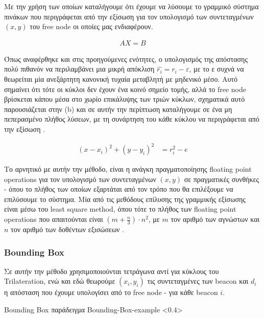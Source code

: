 Με την χρήση των οποίων καταλήγουμε ότι έχουμε να λύσουμε το γραμμικό σύστημα πινάκων που περιγράφεται από την εξίσωση  για τον
υπολογισμό των συντεταγμένων $(x,y)$ του free node οι οποίες μας ενδιαφέρουν.

\begin{align}
	AX = B \label{eq:trilateration-linear-system}
\end{align}

Όπως αναφέρθηκε και στις προηγούμενες ενότητες, ο υπολογισμός της απόστασης πολύ πιθανόν να περιλαμβάνει μια μικρή απόκλιση $\widehat{r_i} = r_i - ε$, 
με το ε συχνά να θεωρείται μία ανεξάρτητη κανονική τυχαία μεταβλητή με μηδενικό μέσο. Αυτό σημαίνει ότι
τότε οι κύκλοι δεν έχουν ένα κοινό σημείο τομής, αλλά το free node βρίσκεται κάπου μέσα στο χωρίο επικάλυψης
των τριών κύκλων, σχηματικά αυτό παρουσιάζεται στην  (b) και σε αυτήν την περίπτωση καταλήγουμε σε ένα
μη πεπερασμένο πλήθος λύσεων, με τη συνάρτηση του κάθε κύκλου να περιγράφεται από την εξίσωση
 \cite{wsn-Localization-systems}.

\begin{align}
	(x-x_i)^2 + (y-y_i)^2 &= r_i^2-e \label{eq:trilateration-circles-error}
\end{align}

Το αρνητικό με αυτήν την μέθοδο, είναι η ανάγκη πραγματοποίησης floating point operations για τον υπολογισμό των συντεταγμένων $(x,y)$ σε πραγματικές συνθήκες - όπου το πλήθος
των οποίων εξαρτάται από τον τρόπο που θα επιλέξουμε να επιλύσουμε το σύστημα. 
Μία από τις μεθόδους επίλυσης της γραμμικής εξίσωσης είναι μέσω του least square method, όπου τότε το πλήθος των floating point operations
που απαιτούνται είναι $(m+\frac{n}{3})\cdot n^2$, με $m$ τον αριθμό των αγνώστων και $n$ τον αριθμό των δοθέντων εξισώσεων \cite{wsn-Localization-systems}.

\subsubsection{Bounding Box}
Σε αυτήν την μέθοδο χρησιμοποιούνται τετράγωνα αντί για κύκλους του Tri\-la\-te\-ra\-tion, ενώ και εδώ θεωρούμε $(x_i,y_i)$
τις συντεταγμένες των beacon και $d_i$ η από\-στα\-ση που έχουμε υπολογίσει από το free node - για κάθε beacon $i$. 

%
{Bounding Box παράδειγμα}%
{Bounding-Box-example}%
<0.4>

